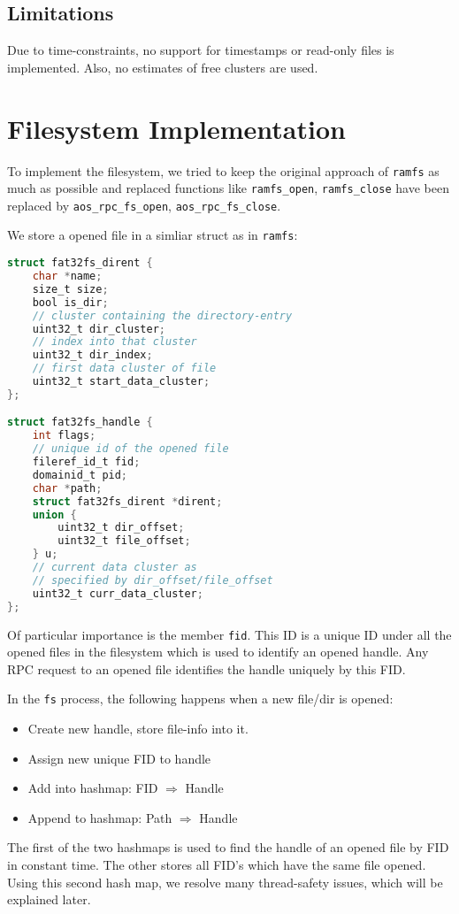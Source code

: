 \subsection{Limitations}
Due to time-constraints, no support for timestamps or read-only files is implemented.
Also, no estimates of free clusters are used.
\section{Filesystem Implementation}
To implement the filesystem, we tried to keep the original approach of \texttt{ramfs}
as much as possible and replaced functions like \texttt{ramfs\_open}, \texttt{ramfs\_close}
have been replaced by \texttt{aos\_rpc\_fs\_open}, \texttt{aos\_rpc\_fs\_close}.

We store a opened file in a simliar struct as in \texttt{ramfs}:
\begin{lstlisting}[language=C]
struct fat32fs_dirent {
    char *name; 
    size_t size; 
    bool is_dir; 
    // cluster containing the directory-entry
    uint32_t dir_cluster; 
    // index into that cluster
    uint32_t dir_index; 
    // first data cluster of file
    uint32_t start_data_cluster; 
};

struct fat32fs_handle {
    int flags;
    // unique id of the opened file
    fileref_id_t fid;
    domainid_t pid;
    char *path;
    struct fat32fs_dirent *dirent;
    union {
        uint32_t dir_offset;
        uint32_t file_offset;
    } u;
    // current data cluster as 
    // specified by dir_offset/file_offset
    uint32_t curr_data_cluster;
};
\end{lstlisting}
Of particular importance is the member \texttt{fid}.
This ID is a unique ID under all the opened files in the filesystem 
which is used to identify an opened handle. Any RPC request to an opened
file identifies the handle uniquely by this FID.

In the \texttt{fs} process, the following happens when a new file/dir is opened:
\begin{itemize}
    \item Create new handle, store file-info into it.
    \item Assign new unique FID to handle
    \item Add into hashmap: FID $\Rightarrow$ Handle 
    \item Append to hashmap: Path $\Rightarrow$ Handle
\end{itemize}
The first of the two hashmaps is used to find the handle of an opened file by FID in constant 
time. The other stores all FID's which have the same file opened. Using this second hash map,
we resolve many thread-safety issues, which will be explained later.

